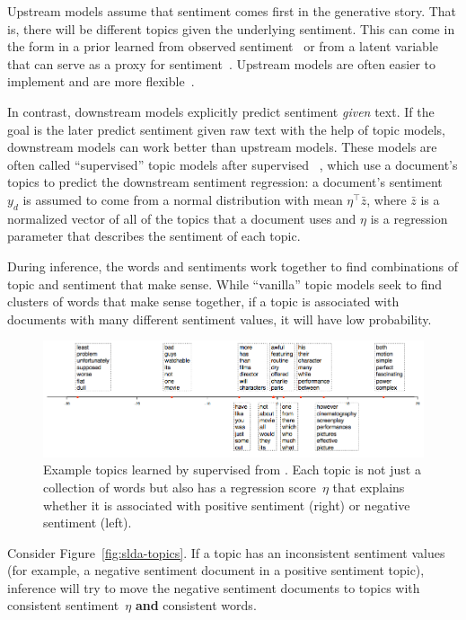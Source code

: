 
Upstream models assume that sentiment comes first in the generative
story.  That is, there will be different topics given the underlying
sentiment.  This can come in the form in a prior learned from observed
sentiment~\citep{mimno-08} or from a latent variable that can serve as
a proxy for sentiment~\citep{lin-09}.  Upstream models are often
easier to implement and are more flexible~\citep{stewart-14}.

In contrast, downstream models explicitly predict sentiment
\emph{given} text.  If the goal is the later predict sentiment given
raw text with the help of topic models, downstream models can work
better than upstream models.  These models are often called
``supervised'' topic models after supervised
~\citep{blei-07b}, which use a document's topics to predict
the downstream sentiment regression: a document's sentiment~$y_d$ is
assumed to come from a normal distribution with mean $\eta^\top \bar
z$, where $\bar z$ is a normalized vector of all of the topics that a
document uses and $\eta$ is a regression parameter that describes the
sentiment of each topic.

During inference, the words and sentiments work together to find
combinations of topic and sentiment that make sense.  While
``vanilla'' topic models seek to find clusters of words that make
sense together, if a topic is associated with documents with many
different sentiment values, it will have low probability.  

\begin{figure}
  \includegraphics[width=0.7\linewidth]{figures/slda}
  \caption{Example topics learned by supervised  from
    \citet{blei-07b}.  Each topic is not just a collection of words
    but also has a regression score~$\eta$ that explains whether it is
    associated with positive sentiment (right) or negative sentiment
    (left).}
\end{figure}

Consider Figure~\ref{fig:slda-topics}.  If a topic has an inconsistent
sentiment values (for example, a negative sentiment document in a
positive sentiment topic), inference will try to move the negative
sentiment documents to topics with consistent sentiment~$\eta$ {\bf
  and} consistent words.  

